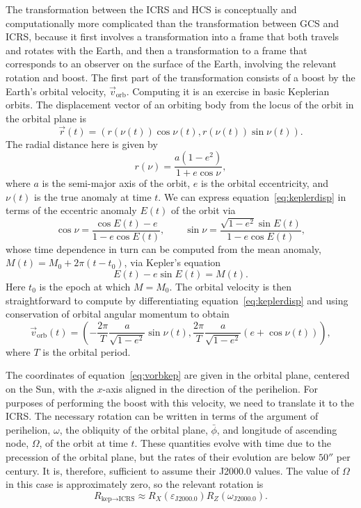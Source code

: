 The transformation between the ICRS and HCS is conceptually and computationally more complicated than the transformation between GCS and ICRS, because it first involves a transformation into a frame that both travels and rotates with the Earth, and then a transformation to a frame that corresponds to an observer on the surface of the Earth, involving the relevant rotation and boost. The first part of the transformation consists of a boost by the Earth's orbital velocity, $\vec{v}_\text{orb}$. Computing it is an exercise in basic Keplerian orbits. The displacement vector of an orbiting body from the locus of the orbit in the orbital plane is
\begin{equation}
    \vec{r}(t)=(r(\nu(t))\cos\nu(t),r(\nu(t))\sin\nu(t)).
    \label{eq:keplerdisp}
\end{equation}
The radial distance here is given by
\begin{equation}
    r(\nu)=\frac{a(1-e^2)}{1+e\cos\nu},
\end{equation}
where $a$ is the semi-major axis of the orbit, $e$ is the orbital eccentricity, and $\nu(t)$ is the true anomaly at time $t$. We can express equation~\eqref{eq:keplerdisp} in terms of the eccentric anomaly $E(t)$ of the orbit via
\begin{equation}
    \cos\nu=\frac{\cos E(t)-e}{1-e\cos E(t)},\qquad\sin\nu=\frac{\sqrt{1-e^2}\sin E(t)}{1-e\cos E(t)},
\end{equation}
whose time dependence in turn can be computed from the mean anomaly, $M(t)=M_0+2\pi(t-t_0)$, via Kepler's equation
\begin{equation}
    E(t)-e\sin E(t)=M(t).
\end{equation}
Here $t_0$ is the epoch at which $M=M_0$. The orbital velocity is then straightforward to compute by differentiating equation~\eqref{eq:keplerdisp} and using conservation of orbital angular momentum to obtain
\begin{equation}
    \vec{v}_\text{orb}(t)=\left(-\frac{2\pi}{T}\frac{a}{\sqrt{1-e^2}}\sin\nu(t),\frac{2\pi}{T}\frac{a}{\sqrt{1-e^2}}(e+\cos\nu(t))\right),
    \label{eq:vorbkep}
\end{equation}
where $T$ is the orbital period.

The coordinates of equation~\eqref{eq:vorbkep} are given in the orbital plane, centered on the Sun, with the $x$-axis aligned in the direction of the perihelion. For purposes of performing the boost with this velocity, we need to translate it to the ICRS. The necessary rotation can be written in terms of the argument of perihelion, $\omega$, the obliquity of the orbital plane, $\bar{\phi}$, and longitude of ascending node, $\Omega$, of the orbit at time $t$. These quantities evolve with time due to the precession of the orbital plane, but the rates of their evolution are below $50''$ per century. It is, therefore, sufficient to assume their J2000.0 values. The value of $\Omega$ in this case is approximately zero, so the relevant rotation is
\begin{equation}
    R_{\text{kep}\rightarrow\text{ICRS}}\approx R_X(\varepsilon_\text{J2000.0})R_Z(\omega_\text{J2000.0}).
\end{equation}

